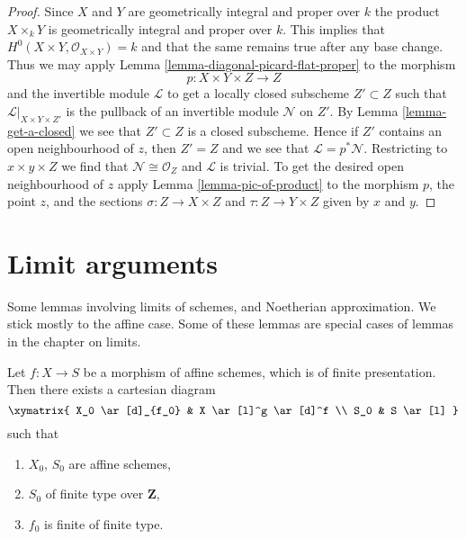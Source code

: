 \begin{proof}
Since $X$ and $Y$ are geometrically integral and proper over $k$
the product $X \times_k Y$ is geometrically integral and proper over $k$.
This implies that $H^0(X \times Y, \mathcal{O}_{X \times Y}) = k$
and that the same remains true after any base change.
Thus we may apply Lemma \ref{lemma-diagonal-picard-flat-proper}
to the morphism
$$
p : X \times Y \times Z \longrightarrow Z
$$
and the invertible module $\mathcal{L}$ to get a locally closed
subscheme $Z' \subset Z$ such that $\mathcal{L}|_{X \times Y \times Z'}$
is the pullback of an invertible module $\mathcal{N}$ on $Z'$. By
Lemma \ref{lemma-get-a-closed}
we see that $Z' \subset Z$ is a closed subscheme.
Hence if $Z'$ contains an open neighbourhood of $z$, then
$Z' = Z$ and we see that $\mathcal{L} = p^*\mathcal{N}$.
Restricting to $x \times y \times Z$ we find that
$\mathcal{N} \cong \mathcal{O}_Z$ and $\mathcal{L}$ is trivial.
To get the desired open neighbourhood of $z$ apply
Lemma \ref{lemma-pic-of-product}
to the morphism $p$, the point $z$, and the sections
$\sigma : Z \to X \times Z$ and $\tau : Z \to Y \times Z$ given by $x$ and $y$.
\end{proof}









\section{Limit arguments}
\label{section-limits}

\noindent
Some lemmas involving limits of schemes, and Noetherian approximation.
We stick mostly to the affine case. Some of these lemmas are special
cases of lemmas in the chapter on limits.

\begin{lemma}
\label{lemma-Noetherian-approximation}
Let $f : X \to S$ be a morphism of affine schemes, which is of finite
presentation. Then there exists a cartesian diagram
$$
\xymatrix{
X_0 \ar[d]_{f_0} & X \ar[l]^g \ar[d]^f \\
S_0 & S \ar[l]
}
$$
such that
\begin{enumerate}
\item $X_0$, $S_0$ are affine schemes,
\item $S_0$ of finite type over $\mathbf{Z}$,
\item $f_0$ is finite of finite type.
\end{enumerate}
\end{lemma}

